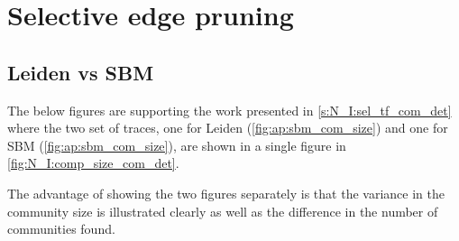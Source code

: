 \chapter{Selective edge pruning} \label{s:ap:sel_prun}

\section{Leiden vs SBM} \label{s:ap:leiden_sbm}

The below figures are supporting the work presented in \cref{s:N_I:sel_tf_com_det} where the two set of traces, one for Leiden (\cref{fig:ap:sbm_com_size}) and one for SBM (\cref{fig:ap:sbm_com_size}), are shown in a single figure in \cref{fig:N_I:comp_size_com_det}. 

The advantage of showing the two figures separately is that the variance in the community size is illustrated clearly as well as the difference in the number of communities found.


